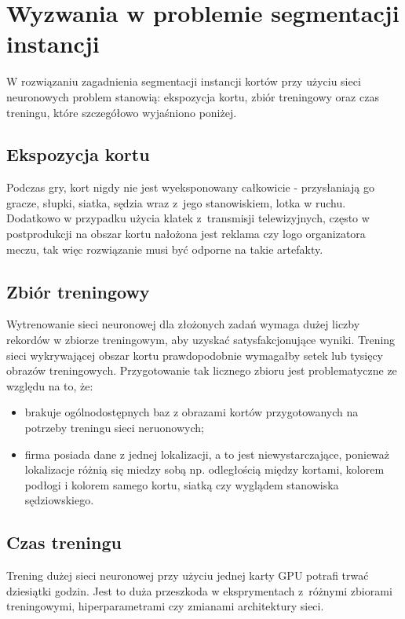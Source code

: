\section{Wyzwania w problemie segmentacji instancji}

W rozwiązaniu zagadnienia segmentacji instancji kortów przy użyciu sieci neuronowych problem stanowią: ekspozycja kortu, zbiór treningowy oraz czas treningu, które szczegółowo wyjaśniono poniżej.

\subsection*{Ekspozycja kortu}

Podczas gry, kort nigdy nie jest wyeksponowany całkowicie - przysłaniają go gracze, słupki, siatka, sędzia wraz z~jego stanowiskiem, lotka w ruchu.
Dodatkowo w przypadku użycia klatek z~transmisji telewizyjnych, często w postprodukcji na obszar kortu nałożona jest reklama czy logo organizatora meczu,  tak więc rozwiązanie musi być odporne na takie artefakty.

\subsection*{Zbiór treningowy}

Wytrenowanie sieci neuronowej dla złożonych zadań wymaga dużej liczby rekordów w zbiorze treningowym, aby uzyskać satysfakcjonujące wyniki.
Trening sieci wykrywającej obszar kortu prawdopodobnie wymagałby setek lub tysięcy obrazów treningowych.
Przygotowanie tak licznego zbioru jest problematyczne ze względu na to, że:

\begin{itemize}
	\item brakuje ogólnodostępnych baz z obrazami kortów przygotowanych na potrzeby treningu sieci neruonowych;
	\item firma posiada dane z jednej lokalizacji, a to jest niewystarczające, ponieważ lokalizacje różnią się miedzy sobą np. odległością między kortami, kolorem podłogi i kolorem samego kortu, siatką czy wyglądem stanowiska sędziowskiego.
\end{itemize}

\subsection*{Czas treningu}

Trening dużej sieci neuronowej przy użyciu jednej karty GPU potrafi trwać dziesiątki godzin.
Jest to duża przeszkoda w eksprymentach z~różnymi zbiorami treningowymi, hiperparametrami czy zmianami architektury sieci.
